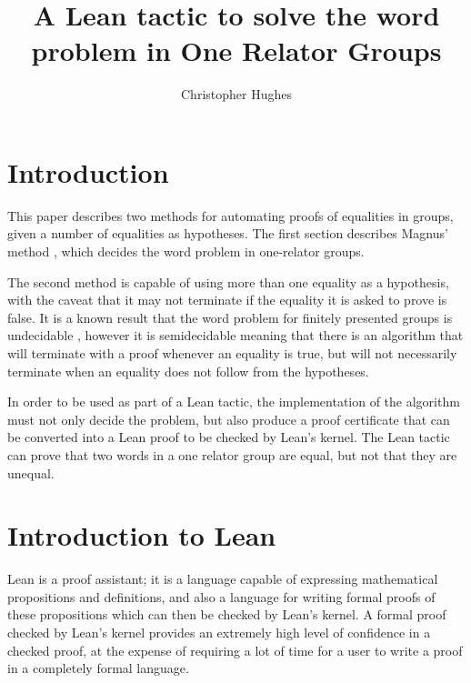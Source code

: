 \documentclass[11pt]{article} %
\title{A Lean tactic to solve the word problem in One Relator Groups}
\author{Christopher Hughes}
\theoremstyle{definition}
\theoremstyle{definition}
\theoremstyle{definition}
\theoremstyle{definition}
\theoremstyle{definition}
\theoremstyle{definition}
\begin{document}
\maketitle
\pagebreak
\tableofcontents
\pagebreak

\section{Introduction}

This paper describes two methods for automating proofs of equalities in groups, given
a number of equalities as hypotheses. The first section describes Magnus' method
\cite{mccool_schupp_1973}, which decides the word problem in one-relator groups.

The second method is capable of using more than one equality as a hypothesis,
with the caveat that it may not terminate if the equality it is asked to prove is false.
It is a known result that the word problem for finitely presented groups is undecidable
\cite{collins1986}, however it is semidecidable meaning that  there is an algorithm
that will terminate with a proof whenever an equality is true, but will not necessarily
terminate when an equality does not follow from the hypotheses.

In order to be used as part of a Lean tactic, the implementation of the
algorithm must not only decide the problem, but also produce a proof certificate
that can be converted into a Lean proof to be checked by Lean's kernel. The Lean
tactic can prove that two words in a one relator group are equal, but not that they are unequal.



\section{Introduction to Lean}

Lean \cite{de_moura_kong_avigad_van_doorn_von_raumer_2018} is a proof assistant; it is a language capable of expressing mathematical propositions
and definitions, and also a language for writing formal proofs of these propositions which
can then be checked by Lean's kernel. A formal proof checked by Lean's kernel provides
an extremely high level of confidence in a checked proof, at the expense of requiring a lot
of time for a user to write a proof in a completely formal language.
\end{document}
